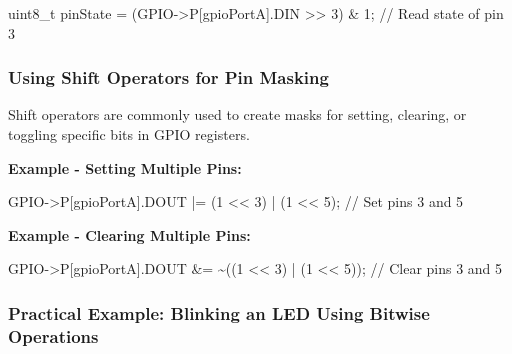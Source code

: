 \documentclass[
  9pt,
  letterpaper,
  abstract,
  titlepage]{scrbook}
\newenvironment{Shaded}{\begin{snugshade}}{\end{snugshade}}
\newcommand{\CommentTok}[1]{\textcolor[rgb]{0.37,0.37,0.37}{#1}}
\newcommand{\DataTypeTok}[1]{\textcolor[rgb]{0.68,0.00,0.00}{#1}}
\newcommand{\DecValTok}[1]{\textcolor[rgb]{0.68,0.00,0.00}{#1}}
\newcommand{\NormalTok}[1]{\textcolor[rgb]{0.00,0.23,0.31}{#1}}
\newcommand{\OperatorTok}[1]{\textcolor[rgb]{0.37,0.37,0.37}{#1}}
\begin{document}
\begin{Shaded}
\begin{Highlighting}[]
\DataTypeTok{uint8\_t}\NormalTok{ pinState }\OperatorTok{=} \OperatorTok{(}\NormalTok{GPIO}\OperatorTok{{-}\textgreater{}}\NormalTok{P}\OperatorTok{[}\NormalTok{gpioPortA}\OperatorTok{].}\NormalTok{DIN }\OperatorTok{\textgreater{}\textgreater{}} \DecValTok{3}\OperatorTok{)} \OperatorTok{\&} \DecValTok{1}\OperatorTok{;} \CommentTok{// Read state of pin 3}
\end{Highlighting}
\end{Shaded}

\subsubsection{Using Shift Operators for Pin
Masking}\label{using-shift-operators-for-pin-masking}

Shift operators are commonly used to create masks for setting, clearing,
or toggling specific bits in GPIO registers.

\textbf{Example - Setting Multiple Pins:}

\begin{Shaded}
\begin{Highlighting}[]
\NormalTok{GPIO}\OperatorTok{{-}\textgreater{}}\NormalTok{P}\OperatorTok{[}\NormalTok{gpioPortA}\OperatorTok{].}\NormalTok{DOUT }\OperatorTok{|=} \OperatorTok{(}\DecValTok{1} \OperatorTok{\textless{}\textless{}} \DecValTok{3}\OperatorTok{)} \OperatorTok{|} \OperatorTok{(}\DecValTok{1} \OperatorTok{\textless{}\textless{}} \DecValTok{5}\OperatorTok{);} \CommentTok{// Set pins 3 and 5}
\end{Highlighting}
\end{Shaded}

\textbf{Example - Clearing Multiple Pins:}

\begin{Shaded}
\begin{Highlighting}[]
\NormalTok{GPIO}\OperatorTok{{-}\textgreater{}}\NormalTok{P}\OperatorTok{[}\NormalTok{gpioPortA}\OperatorTok{].}\NormalTok{DOUT }\OperatorTok{\&=} \OperatorTok{\textasciitilde{}((}\DecValTok{1} \OperatorTok{\textless{}\textless{}} \DecValTok{3}\OperatorTok{)} \OperatorTok{|} \OperatorTok{(}\DecValTok{1} \OperatorTok{\textless{}\textless{}} \DecValTok{5}\OperatorTok{));} \CommentTok{// Clear pins 3 and 5}
\end{Highlighting}
\end{Shaded}

\subsubsection{Practical Example: Blinking an LED Using Bitwise
Operations}\label{practical-example-blinking-an-led-using-bitwise-operations}
\end{document}
